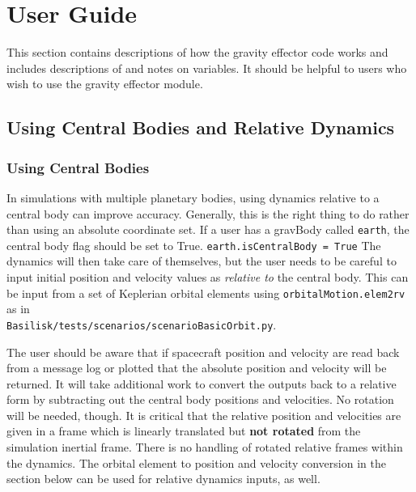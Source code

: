 \section{User Guide}
This section contains descriptions of how the gravity effector code works and includes descriptions of and notes on variables. It should be helpful to users who wish to use the gravity effector module.

\subsection{Using Central Bodies and Relative Dynamics}
\subsubsection{Using Central Bodies}
In simulations with multiple planetary bodies, using dynamics relative to a central body can improve accuracy. Generally, this is the right thing to do rather than using an absolute coordinate set. If a user has a gravBody called \verb|earth|, the central body flag should be set to True.
\verb|earth.isCentralBody = True|	
The dynamics will then take care of themselves, but the user needs to be careful to input initial position and velocity values as \textit{relative to} the central body. This can be input from a set of Keplerian orbital elements using \verb|orbitalMotion.elem2rv| as in\\ \verb|Basilisk/tests/scenarios/scenarioBasicOrbit.py|. 

The user should be aware that if spacecraft position and velocity are read back from a message log or plotted that the absolute position and velocity will be returned. It will take additional work to convert the outputs back to a relative form by subtracting out the central body positions and velocities. No rotation will be needed, though.
It is critical that the relative position and velocities are given in a frame which is linearly translated but \textbf{not rotated} from the simulation inertial frame. There is no handling of rotated relative frames within the dynamics. The orbital element to position and velocity conversion in the section below can be used for relative dynamics inputs, as well.

